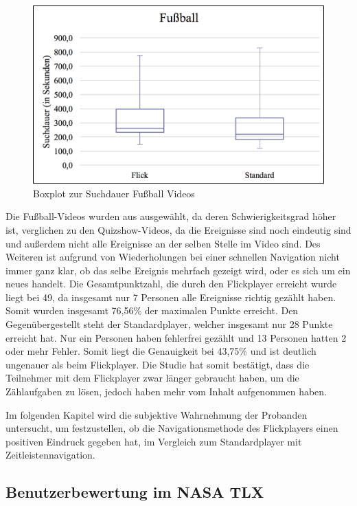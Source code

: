 \documentclass[11pt,a4paper]{report}
\begin{document}
\begin{figure}[h]
\begin{center}
\includegraphics[scale=0.9]{./images/36.png}
\caption{Boxplot zur Suchdauer Fußball Videos}
\label{boxplot_fussball}
\end{center}
\end{figure}
Die Fußball-Videos wurden aus ausgewählt, da deren Schwierigkeitsgrad höher ist, verglichen zu den Quizshow-Videos, da die Ereignisse sind noch eindeutig sind und außerdem nicht alle Ereignisse an der selben Stelle im Video sind. Des Weiteren ist aufgrund von Wiederholungen bei einer schnellen Navigation nicht immer ganz klar, ob das selbe Ereignis mehrfach gezeigt wird, oder es sich um ein neues handelt. Die Gesamtpunktzahl, die durch den Flickplayer erreicht wurde liegt bei 49, da insgesamt nur 7 Personen alle Ereignisse richtig gezählt haben. Somit wurden insgesamt 76,56\% der maximalen Punkte erreicht. Den Gegenübergestellt steht der Standardplayer, welcher insgesamt nur 28 Punkte erreicht hat. Nur ein Personen haben fehlerfrei gezählt und 13 Personen hatten 2 oder mehr Fehler. Somit liegt die Genauigkeit bei 43,75\% und ist deutlich ungenauer als beim Flickplayer. Die Studie hat somit bestätigt, dass die Teilnehmer mit dem Flickplayer zwar länger gebraucht haben, um die Zählaufgaben zu lösen, jedoch haben mehr vom Inhalt aufgenommen haben.

Im folgenden Kapitel wird die subjektive Wahrnehmung der Probanden untersucht, um festzustellen, ob die Navigationsmethode des Flickplayers einen positiven Eindruck gegeben hat, im Vergleich zum Standardplayer mit Zeitleistennavigation.

\subsection{Benutzerbewertung im NASA TLX}
\end{document}
